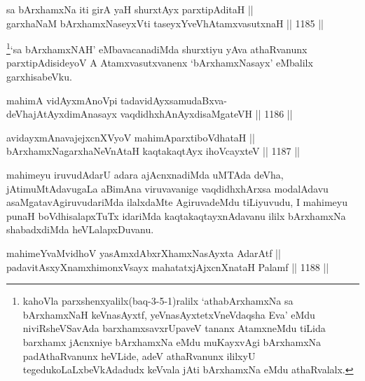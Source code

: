 
\begin{shl}
sa bArxhamxNa iti girA yaH shurxtAyx parxtipAditaH || \\
garxhaNaM bArxhamxNaseyxVti taseyxYveVhA\s \s tamxvasutxnaH ||  1185 ||  
\end{shl}

\begin{artha}
\footnote{kahoVla parxshenxyalilx(baq-3-5-1)ralilx `athabArxhamxNa sa bArxhamxNaH keVnasAyxtf, yeVnasAyxtetxVneVdaqsha Eva' eMdu niviRsheVSavAda barxhamxsavxrUpaveV tananx AtamxneMdu tiLida barxhamx jAcnxniye bArxhamxNa eMdu muKayxvAgi bArxhamxNa padAthaRvanunx heVLide, adeV athaRvanunx ililxyU tegedukoLaLxbeVkAdadudx keVvala jAti bArxhamxNa eMdu athaRvalalx.}`sa bArxhamxNAH' eMbavacanadiMda shurxtiyu yAva athaRvanunx parxtipAdisideyoV A Atamxvasutxvanenx `bArxhamxNasayx' eMbalilx garxhisabeVku.
\end{artha}



\begin{shl}
mahimA vidAyxmAnoV\s pi tadavidAyxsamudaBxva- \\
deVhajAtAyxdimAnasayx vaqdidhxhAnAyxdisaMgateVH ||  1186 ||  
\end{shl}
				
\begin{shl}
avidayxmAnavajejxcnXVyoV mahimAparxtiboVdhataH || \\
bArxhamxNagarxhaNeVnAtaH kaqtakaqtAyx ihoVcayxteV ||  1187 ||  
\end{shl}

\begin{artha}
mahimeyu iruvudAdarU adara ajAcnxnadiMda uMTAda deVha, jAtimuMtAdavugaLa aBimAna viruvavanige vaqdidhxhArxsa modalAdavu asaMgatavAgiruvudariMda ilalxdaMte AgiruvadeMdu tiLiyuvudu, I mahimeyu punaH boVdhisalapxTuTx idariMda kaqtakaqtayxnAdavanu ililx bArxhamxNa shabadxdiMda heVLalapxDuvanu.
\end{artha}


\begin{shl}
mahimeYvaMvidhoV yasAmxdAbxrXhamxNasAyxta AdarAtf || \\
padavitAsxyXnamxhimonxV\s sayx mahatatxjAjxcnXnataH Palamf ||  1188 ||  
\end{shl}

